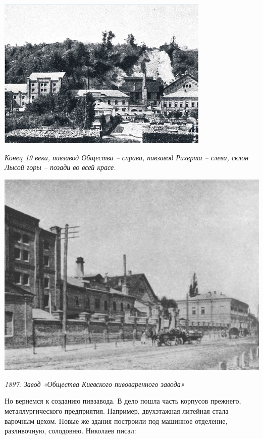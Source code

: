 \begin{center}
\includegraphics[width=\linewidth]{chast-kirvys/lys02/pivzavod-tov-02.png}

\textit{Конец 19 века, пивзавод Общества – справа, пивзавод Рихерта – слева, склон Лысой горы – позади во всей красе.}
\end{center}


\begin{center}
\includegraphics[width=0.95\linewidth]{chast-kirvys/lys02/1897-pivzavod-tov.jpg}

\textit{1897. Завод «Общества Киевского пивоваренного завода»}
\end{center}


Но вернемся к созданию пивзавода. В дело пошла часть корпусов прежнего, металлургического предприятия. Например, двухэтажная литейная стала варочным цехом. Новые же здания построили под машинное отделение, разливочную, солодовню. Николаев писал:

